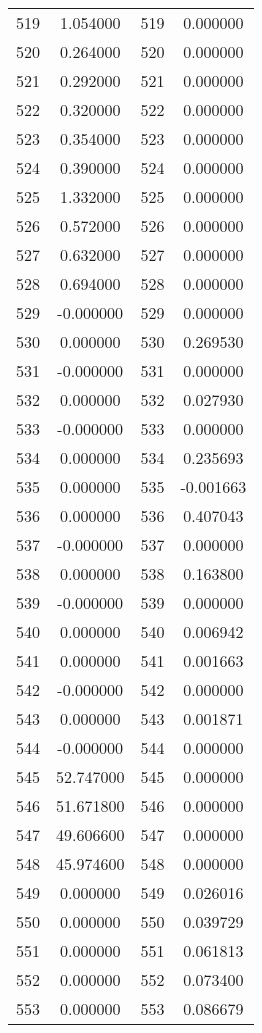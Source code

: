 \documentclass[12pt]{article}
\begin{document}
\begin{longtable}{@{}cccc@{}}
519 & 1.054000 & 519 & 0.000000 \\
520 & 0.264000 & 520 & 0.000000 \\
521 & 0.292000 & 521 & 0.000000 \\
522 & 0.320000 & 522 & 0.000000 \\
523 & 0.354000 & 523 & 0.000000 \\
524 & 0.390000 & 524 & 0.000000 \\
525 & 1.332000 & 525 & 0.000000 \\
526 & 0.572000 & 526 & 0.000000 \\
527 & 0.632000 & 527 & 0.000000 \\
528 & 0.694000 & 528 & 0.000000 \\
529 & -0.000000 & 529 & 0.000000 \\
530 & 0.000000 & 530 & 0.269530 \\
531 & -0.000000 & 531 & 0.000000 \\
532 & 0.000000 & 532 & 0.027930 \\
533 & -0.000000 & 533 & 0.000000 \\
534 & 0.000000 & 534 & 0.235693 \\
535 & 0.000000 & 535 & -0.001663 \\
536 & 0.000000 & 536 & 0.407043 \\
537 & -0.000000 & 537 & 0.000000 \\
538 & 0.000000 & 538 & 0.163800 \\
539 & -0.000000 & 539 & 0.000000 \\
540 & 0.000000 & 540 & 0.006942 \\
541 & 0.000000 & 541 & 0.001663 \\
542 & -0.000000 & 542 & 0.000000 \\
543 & 0.000000 & 543 & 0.001871 \\
544 & -0.000000 & 544 & 0.000000 \\
545 & 52.747000 & 545 & 0.000000 \\
546 & 51.671800 & 546 & 0.000000 \\
547 & 49.606600 & 547 & 0.000000 \\
548 & 45.974600 & 548 & 0.000000 \\
549 & 0.000000 & 549 & 0.026016 \\
550 & 0.000000 & 550 & 0.039729 \\
551 & 0.000000 & 551 & 0.061813 \\
552 & 0.000000 & 552 & 0.073400 \\
553 & 0.000000 & 553 & 0.086679 \\

\end{longtable}
\end{document}
